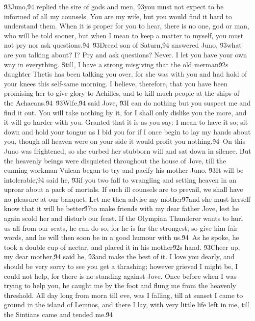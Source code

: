 {\'93Juno,\'94 replied the sire of gods and men, \'93you must not expect to be informed of all my counsels. You are my wife, but you would find it hard to understand them. When it is proper for you to hear, there is no one, god or man, who will be told sooner, but when I mean to keep a matter to myself, you must not pry nor ask questions.\'94\
\'93Dread son of Saturn,\'94 answered Juno, \'93what are you talking about? I? Pry and ask questions? Never. I let you have your own way in everything. Still, I have a strong misgiving that the old merman\'92s daughter Thetis has been talking you over, for she was with you and had hold of your knees this self-same morning. I believe, therefore, that you have been promising her to give glory to Achilles, and to kill much people at the ships of the Achaeans.\'94\
\'93Wife,\'94 said Jove, \'93I can do nothing but you suspect me and find it out. You will take nothing by it, for I shall only dislike you the more, and it will go harder with you. Granted that it is as you say; I mean to have it so; sit down and hold your tongue as I bid you for if I once begin to lay my hands about you, though all heaven were on your side it would profit you nothing.\'94\
On this Juno was frightened, so she curbed her stubborn will and sat down in silence. But the heavenly beings were disquieted throughout the house of Jove, till the cunning workman Vulcan began to try and pacify his mother Juno. \'93It will be intolerable,\'94 said he, \'93if you two fall to wrangling and setting heaven in an uproar about a pack of mortals. If such ill counsels are to prevail, we shall have no pleasure at our banquet. Let me then advise my mother\'97and she must herself know that it will be better\'97to make friends with my dear father Jove, lest he again scold her and disturb our feast. If the Olympian Thunderer wants to hurl us all from our seats, he can do so, for he is far the strongest, so give him fair words, and he will then soon be in a good humour with us.\'94\
As he spoke, he took a double cup of nectar, and placed it in his mother\'92s hand. \'93Cheer up, my dear mother,\'94 said he, \'93and make the best of it. I love you dearly, and should be very sorry to see you get a thrashing; however grieved I might be, I could not help, for there is no standing against Jove. Once before when I was trying to help you, he caught me by the foot and flung me from the heavenly threshold. All day long from morn till eve, was I falling, till at sunset I came to ground in the island of Lemnos, and there I lay, with very little life left in me, till the Sintians came and tended me.\'94\
}
